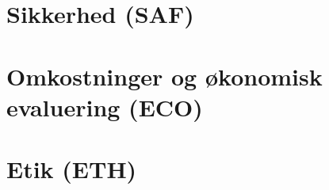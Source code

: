 \chapter{Sikkerhed (SAF)}\vspace{-.75cm} \label{SAF_chap}

%
\chapter{Omkostninger og økonomisk evaluering (ECO)}\vspace{-.75cm} \label{ECO_chap}

\chapter{Etik (ETH)}\vspace{-.75cm} \label{ETH_chap}

\cleardoublepage

\begingroup
\label{litteraturliste}
\raggedright


\endgroup
\begin{appendices}
%	
%	
\end{appendices}



